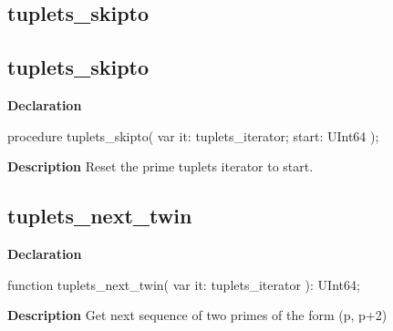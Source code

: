 \documentclass{report}
\newif\ifpdf
\begin{document}
\subsection*{\large{\textbf{tuplets{\_}skipto}}\normalsize\hspace{1ex}\hrulefill}
\else
\subsection*{tuplets{\_}skipto}
\fi
\label{primesieve-tuplets_skipto}
\begin{list}{}{
\setlength{\itemindent}{0cm}
\setlength{\listparindent}{0cm}
\setlength{\leftmargin}{\evensidemargin}
\addtolength{\leftmargin}{\tmplength}
\settowidth{\labelsep}{X}
\addtolength{\leftmargin}{\labelsep}
\setlength{\labelwidth}{\tmplength}
}
\item[\textbf{Declaration}\hfill]
\ifpdf
\begin{flushleft}
\fi
\begin{ttfamily}
procedure tuplets{\_}skipto( var it: tuplets{\_}iterator; start: UInt64 );\end{ttfamily}

\ifpdf
\end{flushleft}
\fi

\par
\item[\textbf{Description}]
Reset the prime tuplets iterator to start.

\end{list}
\ifpdf
\subsection*{\large{\textbf{tuplets{\_}next{\_}twin}}\normalsize\hspace{1ex}\hrulefill}
\else
\subsection*{tuplets{\_}next{\_}twin}
\fi
\label{primesieve-tuplets_next_twin}
\begin{list}{}{
\setlength{\itemindent}{0cm}
\setlength{\listparindent}{0cm}
\setlength{\leftmargin}{\evensidemargin}
\addtolength{\leftmargin}{\tmplength}
\settowidth{\labelsep}{X}
\addtolength{\leftmargin}{\labelsep}
\setlength{\labelwidth}{\tmplength}
}
\item[\textbf{Declaration}\hfill]
\ifpdf
\begin{flushleft}
\fi
\begin{ttfamily}
function tuplets{\_}next{\_}twin( var it: tuplets{\_}iterator ): UInt64;\end{ttfamily}

\ifpdf
\end{flushleft}
\fi

\par
\item[\textbf{Description}]
Get next sequence of two primes of the form (p, p+2)

\end{list}
\ifpdf
\end{document}
